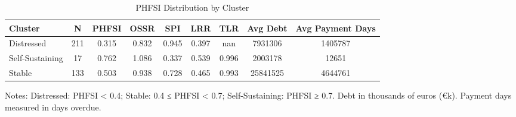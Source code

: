 \begin{table}[htbp]
\centering
\caption{PHFSI Distribution by Cluster}
\label{tab:phfsi_clusters}
\begin{tabular}{lcccccccc}
\hline\hline
Cluster & N & PHFSI & OSSR & SPI & LRR & TLR & Avg Debt & Avg Payment Days \\
\hline
Distressed & 211 & 0.315 & 0.832 & 0.945 & 0.397 & nan & 7931306 & 1405787 \\
Self-Sustaining & 17 & 0.762 & 1.086 & 0.337 & 0.539 & 0.996 & 2003178 & 12651 \\
Stable & 133 & 0.503 & 0.938 & 0.728 & 0.465 & 0.993 & 25841525 & 4644761 \\
\hline\hline
\end{tabular}
\begin{tablenotes}
\small
\item Notes: Distressed: PHFSI < 0.4; Stable: 0.4 ≤ PHFSI < 0.7; 
Self-Sustaining: PHFSI ≥ 0.7. Debt in thousands of euros (€k). 
Payment days measured in days overdue.
\end{tablenotes}
\end{table}